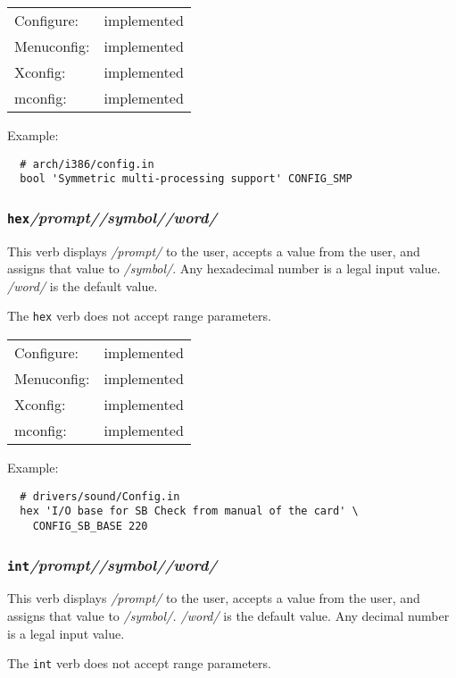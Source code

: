 \begin{tabular}{ll}
Configure:  &implemented\\
Menuconfig: &implemented\\
Xconfig:    &implemented\\
mconfig:    &implemented\\
\end{tabular}

Example:
{\small\begin{verbatim}
  # arch/i386/config.in
  bool 'Symmetric multi-processing support' CONFIG_SMP
\end{verbatim}}



\subsubsection{\texttt{hex}\quad\textit{/prompt/}\quad\textit{/symbol/}\quad\textit{/word/}}

This verb displays \textit{/prompt/} to the user, accepts a value from the user,
and assigns that value to \textit{/symbol/}.  Any hexadecimal number is a legal
input value.  \textit{/word/} is the default value.

The \texttt{hex} verb does not accept range parameters.

\begin{tabular}{ll}
Configure:  &implemented\\
Menuconfig: &implemented\\
Xconfig:    &implemented\\
mconfig:    &implemented\\
\end{tabular}

Example:
{\small\begin{verbatim}
  # drivers/sound/Config.in
  hex 'I/O base for SB Check from manual of the card' \
    CONFIG_SB_BASE 220
\end{verbatim}}


\subsubsection{\texttt{int}\quad \textit{/prompt/}\quad \textit{/symbol/}\quad \textit{/word/}}

This verb displays \textit{/prompt/} to the user, accepts a value from the user,
and assigns that value to \textit{/symbol/.  /word/} is the default value.
Any decimal number is a legal input value.

The \texttt{int} verb does not accept range parameters.

